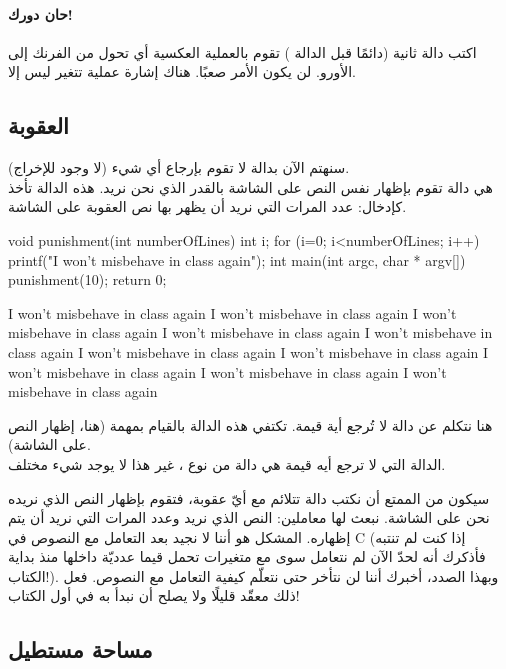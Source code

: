 \paragraph{حان دورك!}
اكتب دالة ثانية (دائمًا قبل الدالة 
)
تقوم بالعملية العكسية أي تحول من الفرنك إلى الأورو. لن يكون الأمر صعبًا. هناك إشارة عملية تتغير ليس إلا.

\subsection{العقوبة}

سنهتم الآن بدالة لا تقوم بإرجاع أي شيء (لا وجود للإخراج).\\
هي دالة تقوم بإظهار نفس النص على الشاشة بالقدر الذي نحن نريد. هذه الدالة تأخذ كإدخال: عدد المرات التي نريد أن يظهر بها نص العقوبة على الشاشة.

\begin{Csource}
void punishment(int numberOfLines)
{
	int i;
	for (i=0; i<numberOfLines; i++){
		printf("I won't misbehave in class again\n");
	}
}
int main(int argc, char * argv[])
{
	punishment(10);
	return 0;
}
\end{Csource}

\begin{Console}
I won't misbehave in class again
I won't misbehave in class again
I won't misbehave in class again
I won't misbehave in class again
I won't misbehave in class again
I won't misbehave in class again
I won't misbehave in class again
I won't misbehave in class again
I won't misbehave in class again
I won't misbehave in class again
\end{Console}

هنا نتكلم عن دالة لا تُرجع أية قيمة. تكتفي هذه الدالة بالقيام بمهمة (هنا، إظهار النص على الشاشة).\\
الدالة التي لا ترجع أيه قيمة هي دالة من نوع 
،
غير هذا لا يوجد شيء مختلف.

سيكون من الممتع أن نكتب دالة 
تتلائم مع أيّ عقوبة، فتقوم بإظهار النص الذي نريده نحن على الشاشة. نبعث لها معاملين: النص الذي نريد وعدد المرات التي نريد أن يتم إظهاره. المشكل هو أننا لا نجيد بعد التعامل مع النصوص في \textenglish{C}
(إذا كنت لم تنتبه فأذكرك أنه لحدّ الآن لم نتعامل سوى مع متغيرات تحمل قيما عدديّة داخلها منذ بداية الكتاب!). وبهذا الصدد، أخبرك أننا لن نتأخر حتى نتعلّم كيفية التعامل مع النصوص. فعل ذلك معقّد قليلًا ولا يصلح أن نبدأ به في أول الكتاب!

\subsection{مساحة مستطيل}

